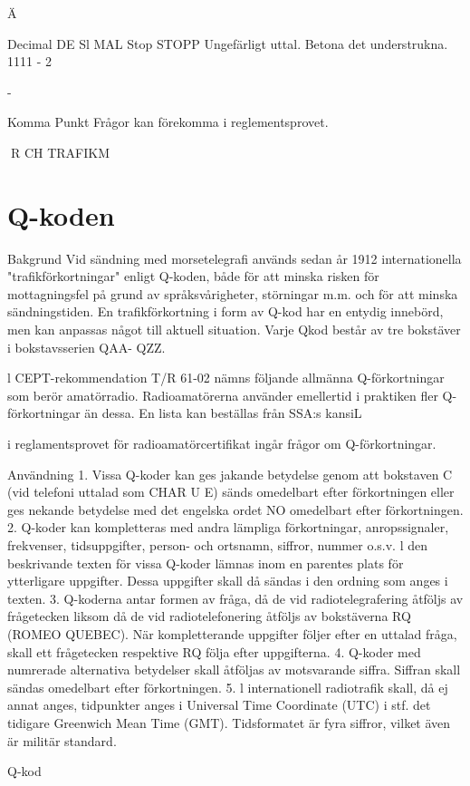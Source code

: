 Ä

Decimal
DE Sl MAL
Stop
STOPP
Ungefärligt uttal. Betona det understrukna.
1111 - 2

-

Komma
Punkt
Frågor kan förekomma i reglementsprovet.

R CH TRAFIKM
\section{Q-koden}
Bakgrund
Vid sändning med morsetelegrafi används
sedan år 1912 internationella "trafikförkortningar" enligt Q-koden, både för att minska
risken för mottagningsfel på grund av språksvårigheter, störningar m.m. och för att minska sändningstiden. En trafikförkortning i form
av Q-kod har en entydig innebörd, men kan
anpassas något till aktuell situation. Varje Qkod består av tre bokstäver i bokstavsserien
QAA- QZZ.

l CEPT-rekommendation T/R 61-02
nämns följande allmänna Q-förkortningar
som berör amatörradio.
Radioamatörerna använder emellertid i praktiken fler Q-förkortningar än
dessa. En lista kan beställas från SSA:s
kansiL

i reglamentsprovet för radioamatörcertifikat ingår frågor om Q-förkortningar.

Användning
1. Vissa Q-koder kan ges jakande betydelse
genom att bokstaven C (vid telefoni uttalad som CHAR U E) sänds omedelbart
efter förkortningen eller ges nekande betydelse med det engelska ordet NO omedelbart efter förkortningen.
2. Q-koder kan kompletteras med andra
lämpliga förkortningar, anropssignaler,
frekvenser, tidsuppgifter, person- och
ortsnamn, siffror, nummer o.s.v. l den beskrivande texten för vissa Q-koder lämnas inom en parentes plats för ytterligare
uppgifter. Dessa uppgifter skall då sändas i den ordning som anges i texten.
3. Q-koderna antar formen av fråga, då de
vid radiotelegrafering åtföljs av frågetecken liksom då de vid radiotelefonering
åtföljs av bokstäverna RQ (ROMEO
QUEBEC). När kompletterande uppgifter följer efter en uttalad fråga, skall ett
frågetecken respektive RQ följa efter
uppgifterna.
4. Q-koder med numrerade alternativa betydelser skall åtföljas av motsvarande
siffra. Siffran skall sändas omedelbart
efter förkortningen.
5. l internationell radiotrafik skall, då ej annat anges, tidpunkter anges i Universal
Time Coordinate (UTC) i stf. det tidigare
Greenwich Mean Time (GMT). Tidsformatet är fyra siffror, vilket även är militär
standard.

Q-kod

